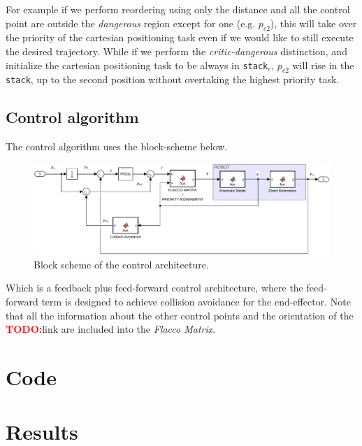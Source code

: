 \documentclass[12pt,a4paper, twocolumn, twoside]{article}
\newcommand{\todo}{\textcolor{red}{\textbf{TODO:}}}
\begin{document}
For example if we perform reordering using only the distance and all the control point are outside the \emph{dangerous} region except for one (e.g. $p_{c2}$), this will take over the priority of the cartesian positioning task even if we would like to still execute the desired trajectory. While if we perform the \emph{critic-dangerous} distinction, and initialize the cartesian positioning task to be always in \texttt{stack$_c$}, $p_{c2}$ will rise in the \texttt{stack}, up to the second position without overtaking the highest priority task.
\subsection{Control algorithm}
The control algorithm uses the block-scheme below.
\begin{figure}[t]
\centering
\includegraphics[width = \linewidth]{./plots/ControlSchemeModel.pdf}
\caption{Block scheme of the control architecture.}
\end{figure}

Which is a feedback plus feed-forward control architecture, where the feed-forward term is designed to achieve collision avoidance for the end-effector.
Note that all the information about the other control points and the orientation of the \todo link are included into the \emph{Flacco Matrix}.
\section{Code}

\section{Results}



\tableofcontents
\end{document}

